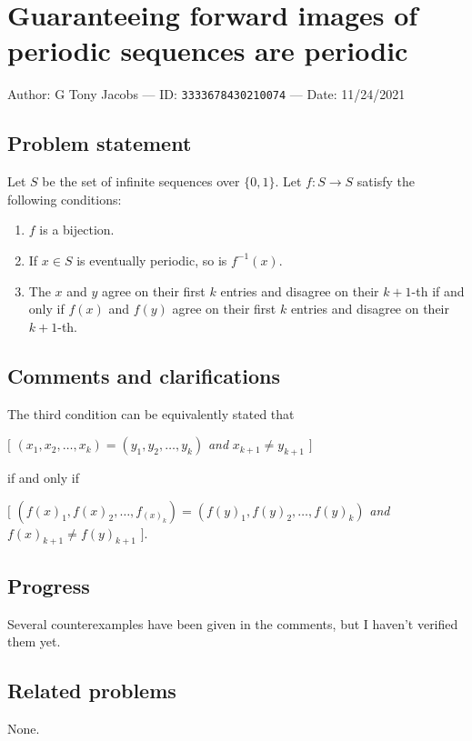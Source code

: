 
\section{Guaranteeing forward images of periodic sequences are periodic}

Author: G Tony Jacobs --- ID: \verb`3333678430210074` --- Date: 11/24/2021

\subsection{Problem statement}

Let $S$ be the set of infinite sequences over $\{0,1\}$. Let $f:S\to S$ satisfy the following conditions:

\begin{enumerate}
  \item $f$ is a bijection.
  \item If $x\in S$ is eventually periodic, so is $f^{-1}(x)$.
  \item The $x$ and $y$ agree on their first $k$ entries and disagree on their $k+1$-th if and only if $f(x)$ and $f(y)$ agree on their first $k$ entries and disagree on their $k+1$-th.
\end{enumerate}

\subsection{Comments and clarifications}

The third condition can be equivalently stated that

\BlankLine

$\Big[$ $(x_1,x_2,\ldots,x_k)=(y_1,y_2,\ldots,y_k)$ \textit{and} $x_{k+1}\neq y_{k+1}$ $\Big]$

\BlankLine

if and only if

\BlankLine

$\Big[$ $(f(x)_1,f(x)_2,\ldots,f_(x)_k)=(f(y)_1,f(y)_2,\ldots,f(y)_k)$ \textit{and} $f(x)_{k+1}\neq f(y)_{k+1}$ $\Big]$.

\subsection{Progress}

Several counterexamples have been given in the comments, but I haven't verified them yet.

\subsection{Related problems}

None.

